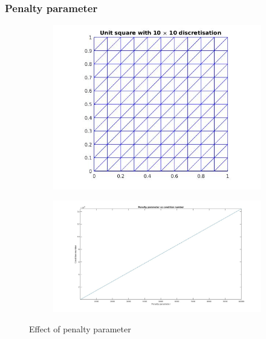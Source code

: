\documentclass{beamer}
\begin{document}
\begin{frame}
\frametitle{Penalty parameter}
\begin{figure}
\begin{subfigure}{0.25\textwidth}	
  \includegraphics[width=\linewidth]{grid_penalty_parameter.jpg}
  \label{grid_penalty_para}
\end{subfigure}
\begin{subfigure}{0.7\textwidth}	
	\includegraphics[width=\linewidth]{penalty_condition_number.jpg}
	\label{penalty_condition_number}
\end{subfigure}
\caption{Effect of penalty parameter}
\label{effect_penalty_parameter}
\end{figure}
\end{frame}
\end{document}

